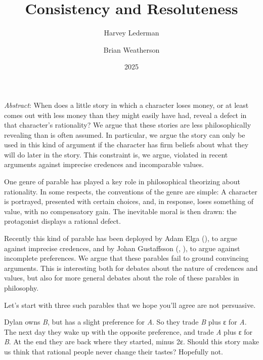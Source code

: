 \documentclass[
  11pt,
  letterpaper,
  DIV=11,
  numbers=noendperiod,
  twoside]{scrartcl}
\title{Consistency and Resoluteness}
\author{Harvey Lederman \and Brian Weatherson}
\date{2025}
\renewenvironment{abstract}
 {\vspace{-1.25cm}
 \quotation\small\noindent\emph{Abstract}:}
 {\endquotation}
\begin{document}
\maketitle
\begin{abstract}
When does a little story in which a character loses money, or at least
comes out with less money than they might easily have had, reveal a
defect in that character's rationality? We argue that these stories are
less philosophically revealing than is often assumed. In particular, we
argue the story can only be used in this kind of argument if the
character has firm beliefs about what they will do later in the story.
This constraint is, we argue, violated in recent arguments against
imprecise credences and incomparable values.
\end{abstract}


One genre of parable has played a key role in philosophical theorizing
about rationality. In some respects, the conventions of the genre are
simple: A character is portrayed, presented with certain choices, and,
in response, loses something of value, with no compensatory gain. The
inevitable moral is then drawn: the protagonist displays a rational
defect.

Recently this kind of parable has been deployed by Adam Elga
(), to argue against imprecise credences,
and by Johan Gustaffsson (,
), to argue against incomplete
preferences. We argue that these parables fail to ground convincing
arguments. This is interesting both for debates about the nature of
credences and values, but also for more general debates about the role
of these parables in philosophy.

Let's start with three such parables that we hope you'll agree are not
persuasive.

Dylan owns \emph{B}, but has a slight preference for \emph{A}. So they
trade \emph{B} plus ε for \emph{A}. The next day they wake up with the
opposite preference, and trade \emph{A} plus ε for \emph{B}. At the end
they are back where they started, minus 2ε. Should this story make us
think that rational people never change their tastes? Hopefully not.
\end{document}
